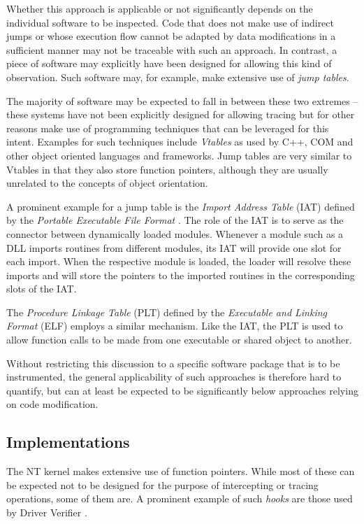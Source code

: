 Whether this approach is applicable or not significantly depends on the individual
software to be inspected. Code that does not make use of indirect jumps
or whose execution flow cannot be adapted by data modifications in a sufficient manner
may not be traceable with such an approach. In contrast, a piece of software may explicitly
have been designed for allowing this kind of observation. Such software
may, for example, make extensive use of \emph{jump tables}. 

The majority of software may be expected
to fall in between these two extremes -- these systems have not been explicitly
designed for allowing tracing but for other reasons make use of programming techniques
that can be leveraged for this intent. Examples for such techniques 
include \emph{Vtables} as used by C++, COM \cite{Box98} and other object oriented languages and
frameworks. Jump tables are very similar to Vtables in that they also store function 
pointers, although they are usually unrelated to the concepts of object orientation. 

A prominent
example for a jump table is the \emph{Import Address Table} (IAT) defined by the 
\emph{Portable Executable File Format} \cite{Pecoff06}. The role of the IAT is to serve
as the connector between dynamically loaded modules. Whenever a module such as a DLL
imports routines from different modules, its IAT will provide one slot for each import.
When the respective module is loaded, the loader will resolve these imports and will 
store the pointers to the imported routines in the corresponding slots of the IAT. 

The \emph{Procedure Linkage Table} (PLT) defined by the \emph{Executable and Linking Format} (ELF) \cite{elf}
employs a similar mechanism. Like the IAT, the PLT is used to allow function calls to be made 
from one executable or shared object to another.

Without restricting this discussion to a specific software package that is to be 
instrumented, the general applicability of such approaches is therefore hard to 
quantify, but can at least be expected to be significantly below approaches relying on code
modification.


\subsection*{Implementations}
The NT kernel makes extensive use of function pointers. While most of these can
be expected not to be designed for the purpose of intercepting or tracing operations,
some of them are. A prominent example of such \emph{hooks} are those used by
Driver Verifier \cite{DriverVerifier}.

